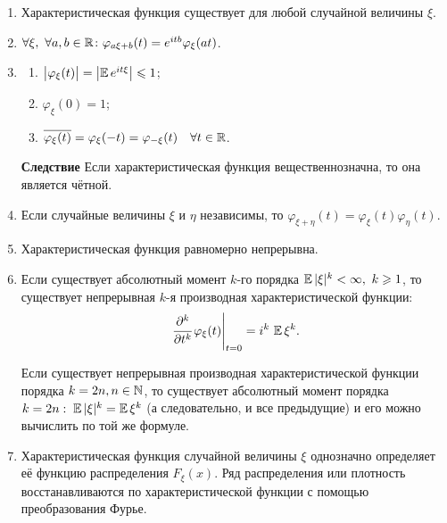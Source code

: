 \begin{namedthm}\leavevmode
    \begin{enumerate}
        \item 
            Характеристическая функция существует для любой случайной величины $\xi$.
        \item 
            $\forall \xi, ~\forall a, b \in \mathbb{R} \colon \varphi_{a \xi + b}(t) = e^{itb} \varphi_{\xi}(at)$.
        \item 
            \begin{enumerate}
                \item $ \bigl| \varphi_{\xi}(t) \bigr| = \bigl| \operatorname{\mathbb{E}} e^{i t \xi} \bigr| \leqslant 1 $;
                \item $ \varphi_{\xi}(0) = 1 $;
                \item $ \overline{\varphi_{\xi}(t)} = \varphi_{\xi}(-t) = \varphi_{-\xi}(t) \quad \forall t \in \mathbb{R}$.
            \end{enumerate}
            \textbf{Следствие}
                Если характеристическая функция вещественнозначна, то она является чётной.
        \item 
            Если случайные величины $\xi$ и $\eta$ независимы, то $\varphi_{\xi + \eta}(t) = \varphi_{\xi}(t) \varphi_{\eta}(t)$.
        \item 
            Характеристическая функция равномерно непрерывна.
        \item 
            Если существует абсолютный момент $k$-го порядка $\operatorname{\mathbb{E}} |\xi|^{k} < \infty,~ k \geqslant 1$, 
            то существует непрерывная $k$-я производная характеристической функции:
            \begin{equation*}
                \left.\cfrac{\partial^{k}}{\partial t^{k}} \, \varphi_{\xi}(t)\right|_{t=0}= i^{k} \, \operatorname{\mathbb{E}} \xi^{k}.
            \end{equation*}
            
            Если существует непрерывная производная характеристической функции порядка $k = 2n, n \in \mathbb{N}$, 
            то существует абсолютный момент порядка $k = 2n: \; \operatorname{\mathbb{E}} |\xi|^k = \operatorname{\mathbb{E}} \xi^k$ (а следовательно, и все предыдущие) 
            и его можно вычислить по той же формуле.
        
        \item 
            Характеристическая функция случайной величины $\xi$ однозначно определяет её функцию распределения $F_{\xi}(x)$. 
            Ряд распределения или плотность восстанавливаются по характеристической функции с помощью преобразования Фурье.
            

\end{enumerate}
\end{namedthm}

